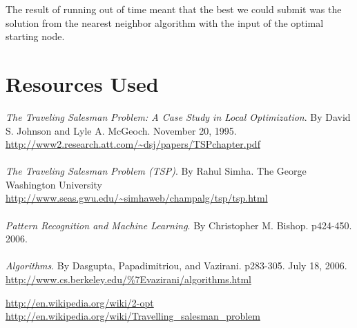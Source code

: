 \documentclass[12pt]{article}
\begin{document}
The result of running out of time meant that the best we could submit was the
solution from the nearest neighbor algorithm with the input of the optimal
starting node.

\section*{Resources Used}

\emph{The Traveling Salesman Problem: A Case Study in Local Optimization}.  By
David S. Johnson and Lyle A. McGeoch. November 20, 1995.
\url{http://www2.research.att.com/~dsj/papers/TSPchapter.pdf}\\
\\

\emph{The Traveling Salesman Problem (TSP)}.  By Rahul Simha. The George
Washington University
\url{http://www.seas.gwu.edu/~simhaweb/champalg/tsp/tsp.html}\\
\\

\emph{Pattern Recognition and Machine Learning}. By Christopher M. Bishop.
p424-450. 2006.\\
\\

\emph{Algorithms}. By Dasgupta, Papadimitriou, and Vazirani. p283-305. July 18,
2006.  \url{http://www.cs.berkeley.edu/%7Evazirani/algorithms.html}

\url{http://en.wikipedia.org/wiki/2-opt}
\url{http://en.wikipedia.org/wiki/Travelling_salesman_problem}
\end{document}
